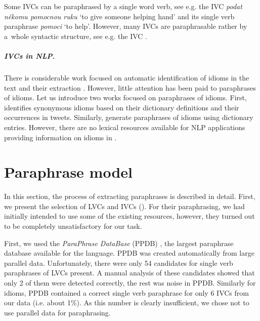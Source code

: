\documentclass[output=paper
,modfonts
,nonflat]{langsci/langscibook}
\begin{document}
Some IVCs can be paraphrased by a single word verb, see e.g. the IVC 
\textit{podat někomu pomocnou ruku} `to give someone helping hand' and its 
single verb paraphrase \textit{pomoci} `to help'. However, many IVCs are 
paraphrasable rather by a~whole syntactic structure, see e.g. the IVC 
.

 \subparagraph*{IVCs in NLP.} There is considerable work focused on automatic identification
 of idioms in the text and their extraction
\citep{cook-07,li-2009,muzny2013,peng-15,Katz06automaticidentification}. 
However, little attention has been paid to paraphrases of idioms. Let us 
introduce two works focused on paraphrases of idioms. First, \citet{pershina-15} 
identifies synonymous idioms based on their dictionary definitions  and their 
occurrences in tweets. Similarly, \citet{liu2016phrasal} generate paraphrases 
of idioms using  dictionary entries. However, there are no lexical
resources available for NLP applications providing information on idioms in . 


\section{Paraphrase model}
\label{CPs}


In this section, the process of extracting paraphrases is described in detail. 
First, we present the selection of LVCs and IVCs (). For 
their paraphrasing, we had initially intended to use some of the existing 
resources, however, they turned out to be completely unsatisfactory for 
our task.

First, we used the \emph{ParaPhrase DataBase} (PPDB) \citep{ppdb}, 
the largest paraphrase database available for the  language. PPDB was 
created automatically from large parallel data. Unfortunately, there were only 
54 candidates for single verb paraphrases of LVCs present. A manual analysis of 
these candidates showed that only 2 of them were detected correctly, the 
rest was noise in PPDB. Similarly for idioms, PPDB contained a correct single 
verb paraphrase for only 6 IVCs from our data (i.e. about 1\%). As this number 
is clearly insufficient, we chose not to use parallel data for paraphrasing.
\end{document}

